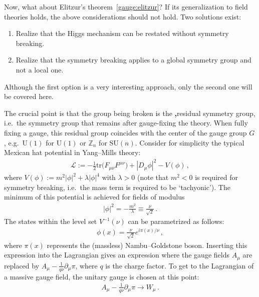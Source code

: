     Now, what about Elitzur's theorem~\ref{gauge:elitzur}? If its generalization to field theories holds, the above considerations should not hold. Two solutions exist:
    \begin{enumerate}
        \item Realize that the Higgs mechanism can be restated without symmetry breaking.
        \item Realize that the symmetry breaking applies to a global symmetry group and not a local one.
    \end{enumerate}
    Although the first option is a very interesting approach, only the second one will be covered here. 

    The crucial point is that the group being broken is the \textbf,{residual symmetry group}, i.e.~the symmetry group that remains after gauge-fixing the theory. When fully fixing a gauge, this residual group coincides with the center of the gauge group $G$, e.g.~$\mathrm{U}(1)$ for $\mathrm{U}(1)$ or $\mathbb{Z}_n$ for $\mathrm{SU}(n)$. Consider for simplicity the typical Mexican hat potential in Yang--Mills theory:
    \begin{gather}
        \mathcal{L} := -\frac{1}{2}\mathrm{tr}\bigl(F_{\mu\nu}F^{\mu\nu}\bigr)+|D_\mu\phi|^2 - V(\phi)\,,
    \end{gather}
    where $V(\phi):=m^2|\phi|^2+\lambda|\phi|^4$ with $\lambda>0$ (note that $m^2<0$ is required for symmetry breaking, i.e.~the mass term is required to be `tachyonic'). The minimum of this potential is achieved for fields of modulus
    \begin{gather}
        |\phi|^2 = -\frac{m^2}{\lambda} \equiv \frac{\nu}{\sqrt{2}}\,.
    \end{gather}
    The states within the level set $V^{-1}(\nu)$ can be parametrized as follows:
    \begin{gather}
        \phi(x) = \frac{\nu}{\sqrt{2}}e^{i\pi(x)/\nu}\,,
    \end{gather}
    where $\pi(x)$ represents the (massless) Nambu--Goldstone boson. Inserting this expression into the Lagrangian gives an expression where the gauge fields $A_\mu$ are replaced by $A_\mu-\frac{1}{q\nu}\partial_\mu\pi$, where $q$ is the charge factor. To get to the Lagrangian of a massive gauge field, the unitary gauge is chosen at this point:
    \begin{gather}
        A_\mu-\frac{1}{q\nu}\partial_\mu\pi\longrightarrow W_\mu\,.
    \end{gather}

